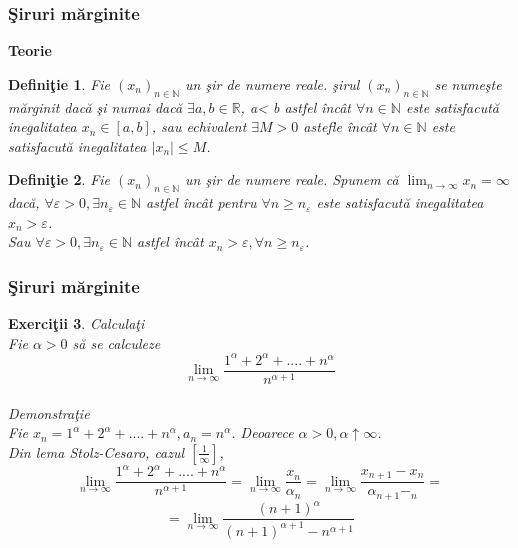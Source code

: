 \documentclass{beamer}
\theoremstyle{plain}
\newtheorem{de}{Defini\c tie}
\newtheorem{ex}[de]{Exerci\c tii}
\begin{document}
\frame
{
\frametitle{\c Siruri m\u arginite}
\textbf{Teorie }

\begin{de}
Fie \((x_{n})_{n\in \mathbb{N}}\) un \c sir de numere reale. 
\c sirul \((x_{n})_{n\in \mathbb{N}}\) se nume\c ste m\u arginit dac\u a \c si numai dac\u a \(\exists  a, b \in \mathbb{R}\), a< b astfel \^ inc\^ at \(\forall n\in \mathbb{N}\) este satisfacut\u a inegalitatea \(x_{n}\in \left [ a,b \right ]\), sau echivalent \(\exists M> 0\) astefle \^ inc\^ at \(\forall  n\in \mathbb{N}\) este satisfacut\u a inegalitatea \(\left | x_{n} \right |\leq M\).
\end{de}
\begin{de}
Fie \((x_{n})_{n\in \mathbb{N}}\) un \c sir de numere reale. Spunem c\u a \(\lim_{n \to \infty }x_{n}=\infty\) dac\u a, \(\forall \varepsilon > 0,\exists n_{\varepsilon }\in \mathbb{N}\) astfel \^ inc\^ at pentru \(\forall n\geq n_{\varepsilon }\) este satisfacut\u a inegalitatea \(x_{n}> \varepsilon\). 
\\Sau \(\forall \varepsilon > 0,\exists n_{\varepsilon }\in \mathbb{N}\) astfel \^ inc\^ at \(x_{n}> \varepsilon ,\forall n\geq n_{\varepsilon }\). 
\end{de}
}
\frame
{
\frametitle{\c Siruri m\u arginite}
\begin{ex}
Calcula\c ti
\\ Fie \(\alpha > 0\) s\u a se calculeze 
\begin{displaymath}
 \lim_{n \to \infty }\frac{1^{\alpha }+2^{\alpha }+....+n^{\alpha }}{n^{\alpha +1}}
\end{displaymath}
\\ Demonstra\c tie 
\\ Fie \(x_{n}=1^{\alpha }+2^{\alpha }+....+n^{\alpha },a_{n}= n^{\alpha }\).  Deoarece \(\alpha > 0 , \alpha \uparrow \infty\). 
\\ Din lema Stolz-Cesaro, cazul \(\left [ \frac{1}{\infty } \right ]\), 
\begin{displaymath}
 \lim_{n \to \infty }\frac{1^{\alpha }+2^{\alpha }+....+n^{\alpha }}{n^{\alpha +1}}=\lim_{n \to \infty }\frac{x_{n}}{\alpha _{n}}=\lim_{n \to \infty } \frac{x_{n+1}-x_{n}}{\alpha _{n+1}-_{n}}=
 
\end{displaymath}
\begin{displaymath}
 =\lim_{n \to \infty } \frac{\left ( n+1 \right )^{\alpha }}{\left ( n+1 \right )^{\alpha+1} -n^{\alpha +1}}
\end{displaymath}
\end{ex}
}
\end{document}
